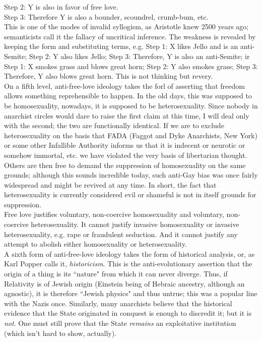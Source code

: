 \documentclass[12pt, onecolumn, letterpaper, oneside]{book}
\begin{document}
\indent Step 2: Y is also in favor of free love.\\
\indent Step 3: Therefore Y is also a bounder, scoundrel, crumb-bum, etc.\\
This is one of the modes of invalid syllogism, as Aristotle knew 2500 years ago; semanticists call it the fallacy of uncritical inference. The weakness is revealed by keeping the form and substituting terms, e.g. Step 1: X likes Jello and is an anti-Semite; Step 2: Y also likes Jello; Step 3: Therefore, Y is also an anti-Semite; ir Step 1: X smokes grass and blows great horn; Step 2: Y also smokes grass; Step 3: Therefore, Y also blows great horn. This is not thinking but revery.\\
On a fifth level, anti-free-love ideology takes the forl of asserting that freedom allows something reprehensible to happen. In the old days, this was supposed to be homosexuality, nowadays, it is supposed to be heterosexuality. Since nobody in anarchist circles would dare to raise the first claim at this time, I will deal only with the second; the two are functionally identical. If we are to exclude heterosexuality on the basis that FADA (Faggot and Dyke Anarchists, New York) or some other Infallible Authority informs us that it is indecent or neurotic or somehow immortal, etc. we have violated the very basis of libertarian thought. Others are then free to demand the suppression of homosexuality on the same grounds; although this sounds incredible today, such anti-Gay bias was once fairly widespread and might be revived at any time. In short, the fact that heterosexuality is currently considered evil or shameful is not in itself grounds for suppression.\\
Free love justifies voluntary, non-coercive homosexuality and voluntary, non-coercive heterosexuality. It cannot justify invasive homosexuality or invasive heterosexuality, e.g. rape or fraudulent seduction. And it cannot justify any attempt to abolish either homosexuality or heterosexuality.\\
A sixth form of anti-free-love ideology takes the form of historical analysis, or, as Karl Popper calls it, \emph{historicism}. This is the anti-evolutionary assertion that the origin of a thing is its ``nature" from which it can never diverge. Thus, if Relativity is of Jewish origin (Einstein being of Hebraic ancestry, although an agnostic), it is therefore ``Jewish physics" and thus untrue; this was a popular line with the Nazis once. Similarly, many anarchists believe that the historical evidence that the State originated in conquest is enough to discredit it; but it is \emph{not}. One must still prove that the State \emph{remains} an exploitative institution (which isn't hard to show, actually).\\
\end{document}
